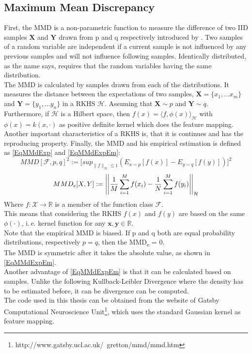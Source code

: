 \subsection{Maximum Mean Discrepancy}\label{TlSubSecMMD}
First, the \acl{MMD} is a non-parametric function to measure the difference of two \ac{IID} samples $\mathbf{X}$ and $\mathbf{Y}$ drawn from p and q respectively introduced by \cite[p. 724-728]{Gretton.2012}.
Two samples of a random variable are independent if a current sample is not influenced by any previous samples and will not influence following samples.
Identically  distributed, as the name says, requires that the random variables having the same distribution.\cite[p. 7-8]{Czado.2011}\\
The \acs{MMD} is calculated by samples drawn from each of the distributions.
It measures the distance between the expectations of two samples, $\textbf{X}=\{x_1,...x_m\}$ and $\textbf{Y}=\{y_1,...y_n\}$
in a \ac{RKHS} $\mathcal{H}$.
Assuming that $\mathbf{X} \sim p$ and $\mathbf{Y} \sim q$.
Furthermore, if $\mathcal{H}$ is a Hilbert space, then $f(x) = \langle f,\phi(x) \rangle_\mathcal{H}$ with $\phi(x) = k(x,\cdot)$ as positive definite kernel which does the feature mapping.
Another important characteristics of a \acs{RKHS} is, that it is continues and has the reproducing property.\cite[p. 36]{Scholkopf.2001}
Finally, the \acs{MMD} and his empirical estimation is defined as \eqref{EqMMdExp} and \eqref{EqMMdExpEm}:\cite[p. 726-727]{Gretton.2012}
\begin{equation}\label{EqMMdExp}
MMD[\mathcal{F},p,q]^2:=\big[sup_{\|f\|_\mathcal{H} \le 1 }(E_{x\sim p}[f(x)] - E_{y\sim q}[f(y)])\big]^2
\end{equation}
\begin{equation}\label{EqMMdExpEm}
MMD_e[X,Y]:= \left\vert\left\vert\frac{1}{M}\sum_{i=1}^{M}f(x_i) - \frac{1}{N}\sum_{i=1}^{M}f(y_i)\right\vert\right\vert_{\mathcal{H}}
\end{equation}
Where $f:\mathcal{X} \to \mathbb{R}$ is a member of the function class $\mathcal{F}$.\\ This means that considering the \acs{RKHS} $f(x)$ and $f(y)$ are based on the same $\phi(\cdot)$, i.\,e. kernel function for any $\mathbf{x,y} \in \mathbb{R}$.\cite[p. 36]{Scholkopf.2001}\\
Note that the empirical \acs{MMD} is biased.
If p and q both are equal probability distributions, respectively $p = q$, then the \ac{MMD}\textsubscript{e} = 0.\cite[p. 726-727]{Gretton.2012}\\
The \acs{MMD} is symmetric after it takes the absolute value, as shown in \eqref{EqMMdExpEm}.\\
Another advantage of \eqref{EqMMdExpEm} is that it can be calculated based on samples.
Unlike the following Kullback-Leibler Divergence where the density has to be estimated before, it can be divergence can be computed.\cite{Long.2015}\\
The code used in this thesis can be obtained from the website of Gatsby Computational Neuroscience Unit\footnote{http://www.gatsby.ucl.ac.uk/~gretton/mmd/mmd.htm}, which uses the standard Gaussian kernel as feature mapping.

